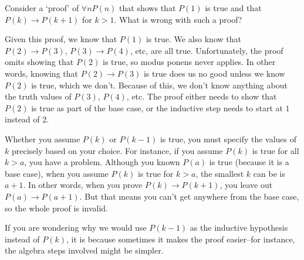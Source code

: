 \begin{ques}
Consider a `proof' of $\forall n P(n)$
that shows that $P(1)$ is true and 
that $P(k)\rightarrow P(k+1)$ for $k>1$.
What is wrong with such a proof?

\noindent
\answerlinetwo
\begin{answer}
Given this proof, we know that $P(1)$ is true.
We also know that 
$P(2)\rightarrow P(3)$, $P(3)\rightarrow P(4)$, etc, 
are all true.
Unfortunately, the proof omits showing that $P(2)$ is true,
so modus ponens never applies.   In other words, knowing that
$P(2)\rightarrow P(3)$ is true does us no good unless we know
$P(2)$ is true, which we don't.  Because of this, we don't
know anything about the truth values of $P(3)$, $P(4)$, etc.
The proof either needs to show that $P(2)$ is true as part of
the base case, or the inductive step needs to start at $1$
instead of $2$. 
\end{answer}
\end{ques}

\begin{rem}
Whether you assume $P(k)$ or $P(k-1)$ is true, 
you must specify the values of $k$ precisely based on your choice.  
For instance, if you assume $P(k)$ is true for all $k>a$, you have a problem.
Although you known $P(a)$ is true (because it is a base case), when you assume 
$P(k)$ is true for $k>a$, the smallest $k$ can be is $a+1$.  In other words, 
when you prove $P(k)\rightarrow P(k+1)$, you leave out $P(a)\rightarrow P(a+1)$.
But that means you can't get anywhere from the base case, so the whole proof is invalid.
\end{rem}

If you are wondering why we would use $P(k-1)$ as the inductive
hypothesis instead of $P(k)$, it is because sometimes it makes
the proof easier--for instance, the algebra steps involved might 
be simpler.  


